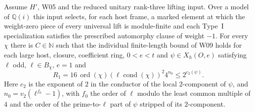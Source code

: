 
\begin{formalstatement}\label{sub:W10}
Assume $H'$, W05 and the reduced unitary rank-three lifting input.
Over a model of $\mathbb Q(i)$ this input selects, for each host frame, a
marked element at which the weight-zero piece of every universal lift
is module-finite and each Type~I specialization satisfies the prescribed
automorphy clause of weight $-1$. For every $\chi$ there is $C\in\mathbb N$
such that the individual finite-length bound of W09 holds for each large
host, closure, coefficient ring, $0<e<t$ and $\psi\in X_h(O,e)$
satisfying $\ell$ odd, $\ell\in B_\chi$, $e=1$ and
\[
 R_1=16\,\operatorname{ord}(\chi)(\ell\operatorname{cond}(\chi))^2
            4^{n_0}\le 2^{c_2(\psi)}.
\]
Here $c_2$ is the exponent of $2$ in the conductor of the local
$2$-component of $\psi$, and $n_0=v_2(\ell^{f_0}-1)$, with $f_0$ the
order of $\ell$ modulo the least common multiple of $4$ and the order
of the prime-to-$\ell$ part of $\psi$ stripped of its $2$-component.
\end{formalstatement}

